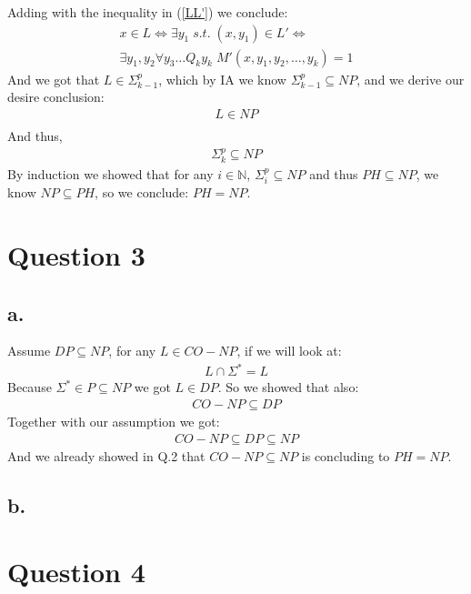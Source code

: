 \documentclass[11pt]{article}
\theoremstyle{plain}
\theoremstyle{nonumberplainnobrackets}
\begin{document}
Adding with the inequality in (\ref{LL'})  we conclude:
\begin{align*}
x\in L \iff \exists y_1 \; s.t.\; (x,y_1) \in L' \iff \\
\exists y_1,y_2  \forall y_3\ldots Q_ky_k \;M'(x,y_1,y_2,\ldots,y_k) =1 
\end{align*}
And we got that $L\in \Sigma_{k-1}^p$, which by IA we know $\Sigma_{k-1}^p\subseteq NP$, and we derive our desire conclusion:
\begin{align*}
L\in NP \\
\end{align*}
And thus,
\begin{align*}
\Sigma_k^p \subseteq NP
\end{align*}
By induction we showed that for any $i\in \mathbb{N}$, $\Sigma_i^p\subseteq NP$ and thus $PH\subseteq NP$, we know $NP\subseteq PH$, so we conclude: $PH= NP$.
\section*{Question 3}
\subsection*{a. }
Assume $DP\subseteq NP$, for any $L\in CO-NP$, if we will look at: \begin{align*}
	L\cap \Sigma^* = L
\end{align*}
Because $\Sigma^*\in P \subseteq NP$ we got $L\in DP$. So we showed that also:\
\begin{align*}
CO-NP \subseteq DP
\end{align*}
Together with our assumption we got:
\begin{align*}
CO-NP \subseteq DP \subseteq NP
\end{align*}
And we already showed in Q.2 that $CO-NP \subseteq NP$ is concluding to $PH=NP$.
\subsection*{b. }
\newpage
\section*{Question 4}
\end{document}

